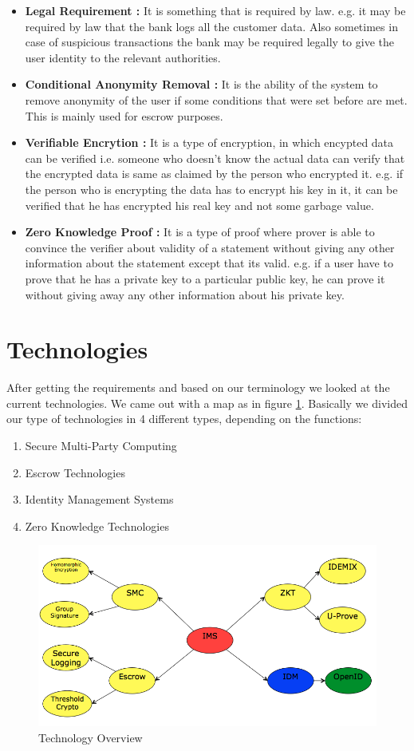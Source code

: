 \begin{itemize}
\item\textbf{Legal Requirement :}
It is something that is required by law. e.g. it may be required by law that the bank logs all the customer data. Also sometimes in case of suspicious transactions the bank may be required legally to give the user identity to the relevant authorities.
\item\textbf{Conditional Anonymity Removal :}
It is the ability of the system to remove anonymity of the user if some conditions that were set before are met. This is mainly used for escrow purposes.
\item\textbf{Verifiable Encrytion :}
It is a type of encryption, in which encypted data can be verified i.e. someone who doesn't know the actual data can verify that the encrypted data is same as claimed by the person who encrypted it. e.g. if the person who is encrypting the data has to encrypt his key in it, it can be verified that he has encrypted his real key and not some garbage value.
\item\textbf{Zero Knowledge Proof :}
It is a type of proof where prover is able to convince the verifier about validity of a statement without giving any other information about the statement except that its valid. e.g. if a user have to prove that he has a private key to a particular public key, he can prove it without giving away any other information about his private key.
\end{itemize}
\section{Technologies}
After getting the requirements and based on our terminology we looked at the current technologies. We came out with a map as in figure \ref{fig:Technologies}. Basically we divided our type of technologies in 4 different types, depending on the functions:
\begin{enumerate}
	\item Secure Multi-Party Computing
	\item Escrow Technologies
	\item Identity Management Systems
	\item Zero Knowledge Technologies
\end{enumerate}
\begin{figure}[h]
	\centering
	\includegraphics[width=\textwidth]{figures/Technologies}
	\caption{Technology Overview}
	\label{fig:Technologies}
\end{figure}
